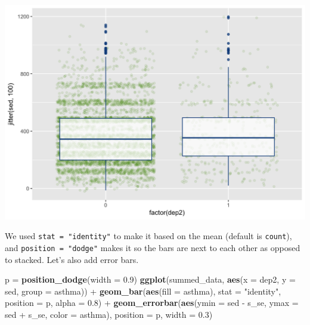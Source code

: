 \documentclass[]{tufte-book}
\newenvironment{Shaded}{}{}
\newcommand{\KeywordTok}[1]{\textcolor[rgb]{0.00,0.44,0.13}{\textbf{#1}}}
\newcommand{\DataTypeTok}[1]{\textcolor[rgb]{0.56,0.13,0.00}{#1}}
\newcommand{\FloatTok}[1]{\textcolor[rgb]{0.25,0.63,0.44}{#1}}
\newcommand{\StringTok}[1]{\textcolor[rgb]{0.25,0.44,0.63}{#1}}
\newcommand{\OperatorTok}[1]{\textcolor[rgb]{0.40,0.40,0.40}{#1}}
\newcommand{\NormalTok}[1]{#1}
\theoremstyle{definition}
\theoremstyle{definition}
\theoremstyle{remark}
\begin{document}
\includegraphics{_main_files/figure-latex/unnamed-chunk-139-1}

We used \texttt{stat\ =\ "identity"} to make it based on the mean
(default is \texttt{count}), and \texttt{position\ =\ "dodge"} makes it
so the bars are next to each other as opposed to stacked. Let's also add
error bars.

\begin{Shaded}
\begin{Highlighting}[]
\NormalTok{p =}\StringTok{ }\KeywordTok{position_dodge}\NormalTok{(}\DataTypeTok{width =} \FloatTok{0.9}\NormalTok{)}
\KeywordTok{ggplot}\NormalTok{(summed_data, }\KeywordTok{aes}\NormalTok{(}\DataTypeTok{x =}\NormalTok{ dep2, }\DataTypeTok{y =}\NormalTok{ sed, }\DataTypeTok{group =}\NormalTok{ asthma)) }\OperatorTok{+}\StringTok{ }
\StringTok{    }\KeywordTok{geom_bar}\NormalTok{(}\KeywordTok{aes}\NormalTok{(}\DataTypeTok{fill =}\NormalTok{ asthma), }\DataTypeTok{stat =} \StringTok{"identity"}\NormalTok{, }
        \DataTypeTok{position =}\NormalTok{ p, }\DataTypeTok{alpha =} \FloatTok{0.8}\NormalTok{) }\OperatorTok{+}\StringTok{ }\KeywordTok{geom_errorbar}\NormalTok{(}\KeywordTok{aes}\NormalTok{(}\DataTypeTok{ymin =}\NormalTok{ sed }\OperatorTok{-}\StringTok{ }
\StringTok{    }\NormalTok{s_se, }\DataTypeTok{ymax =}\NormalTok{ sed }\OperatorTok{+}\StringTok{ }\NormalTok{s_se, }\DataTypeTok{color =}\NormalTok{ asthma), }
    \DataTypeTok{position =}\NormalTok{ p, }\DataTypeTok{width =} \FloatTok{0.3}\NormalTok{)}
\end{Highlighting}
\end{Shaded}
\end{document}
